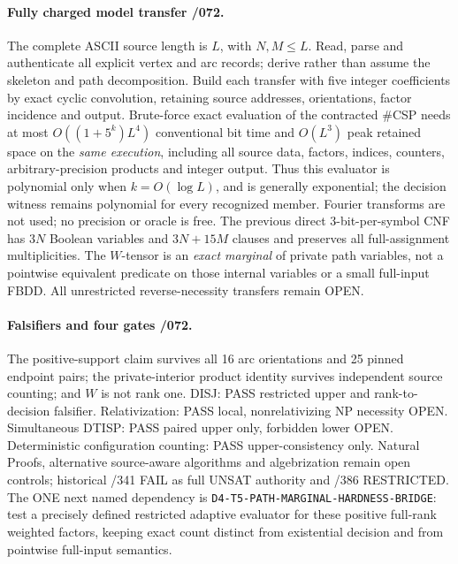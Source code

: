 \documentclass[11pt]{article}
\begin{document}
\paragraph{Fully charged model transfer /072.}
The complete ASCII source length is \(L\), with \(N,M\le L\).
Read, parse and authenticate all explicit vertex and arc records;
derive rather than assume the skeleton and path decomposition.
Build each transfer with five integer coefficients by exact cyclic
convolution, retaining source addresses, orientations, factor
incidence and output. Brute-force exact evaluation of the
contracted \(\#\)CSP needs at most
\(O((1+5^k)L^4)\) conventional bit time and \(O(L^3)\)
peak retained space on the \emph{same execution}, including all
source data, factors, indices, counters, arbitrary-precision products
and integer output. Thus this evaluator is polynomial only when
\(k=O(\log L)\), and is generally exponential; the decision
witness remains polynomial for every recognized member.
Fourier transforms are not used; no precision or oracle is free.
The previous direct 3-bit-per-symbol CNF has \(3N\) Boolean
variables and \(3N+15M\) clauses and preserves all full-assignment
multiplicities. The \(W\)-tensor is an \emph{exact marginal}
of private path variables, not a pointwise equivalent predicate
on those internal variables or a small full-input FBDD.
All unrestricted reverse-necessity transfers remain OPEN.

\paragraph{Falsifiers and four gates /072.}
The positive-support claim survives all 16 arc orientations
and 25 pinned endpoint pairs; the private-interior product identity
survives independent source counting; and \(W\) is not rank one.
DISJ: PASS restricted upper and rank-to-decision falsifier.
Relativization: PASS local, nonrelativizing NP necessity OPEN.
Simultaneous DTISP: PASS paired upper only, forbidden lower OPEN.
Deterministic configuration counting: PASS upper-consistency only.
Natural Proofs, alternative source-aware algorithms and
algebrization remain open controls; historical /341 FAIL as full
UNSAT authority and /386 RESTRICTED. The ONE next named dependency
is \texttt{D4-T5-PATH-MARGINAL-HARDNESS-BRIDGE}: test a precisely
defined restricted adaptive evaluator for these positive full-rank
weighted factors, keeping exact count distinct from existential
decision and from pointwise full-input semantics.
\end{document}
